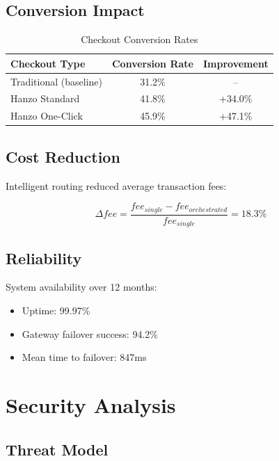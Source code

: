 \documentclass[11pt,a4paper]{article}
\begin{document}
\subsection{Conversion Impact}

\begin{table}[h]
\centering
\caption{Checkout Conversion Rates}
\begin{tabular}{lcc}
\toprule
\textbf{Checkout Type} & \textbf{Conversion Rate} & \textbf{Improvement} \\
\midrule
Traditional (baseline) & 31.2\% & -- \\
Hanzo Standard & 41.8\% & +34.0\% \\
Hanzo One-Click & 45.9\% & +47.1\% \\
\bottomrule
\end{tabular}
\end{table}

\subsection{Cost Reduction}

Intelligent routing reduced average transaction fees:

\begin{equation}
\Delta fee = \frac{fee_{single} - fee_{orchestrated}}{fee_{single}} = 18.3\%
\end{equation}

\subsection{Reliability}

System availability over 12 months:

\begin{itemize}
    \item Uptime: 99.97\%
    \item Gateway failover success: 94.2\%
    \item Mean time to failover: 847ms
\end{itemize}

\section{Security Analysis}

\subsection{Threat Model}
\end{document}
